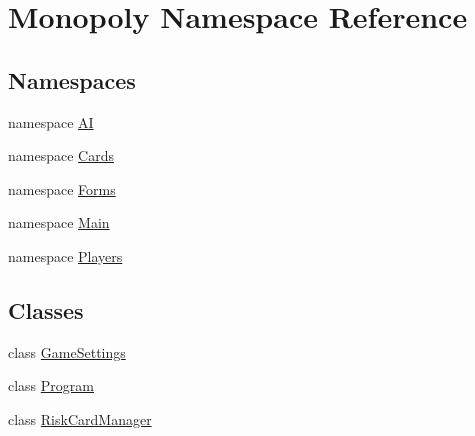 \hypertarget{namespace_monopoly}{}\section{Monopoly Namespace Reference}
\label{namespace_monopoly}
\subsection*{Namespaces}
\begin{DoxyCompactItemize}
\item 
namespace \mbox{\hyperlink{namespace_monopoly_1_1_a_i}{AI}}
\item 
namespace \mbox{\hyperlink{namespace_monopoly_1_1_cards}{Cards}}
\item 
namespace \mbox{\hyperlink{namespace_monopoly_1_1_forms}{Forms}}
\item 
namespace \mbox{\hyperlink{namespace_monopoly_1_1_main}{Main}}
\item 
namespace \mbox{\hyperlink{namespace_monopoly_1_1_players}{Players}}
\end{DoxyCompactItemize}
\subsection*{Classes}
\begin{DoxyCompactItemize}
\item 
class \mbox{\hyperlink{class_monopoly_1_1_game_settings}{Game\+Settings}}
\item 
class \mbox{\hyperlink{class_monopoly_1_1_program}{Program}}
\item 
class \mbox{\hyperlink{class_monopoly_1_1_risk_card_manager}{Risk\+Card\+Manager}}
\end{DoxyCompactItemize}
